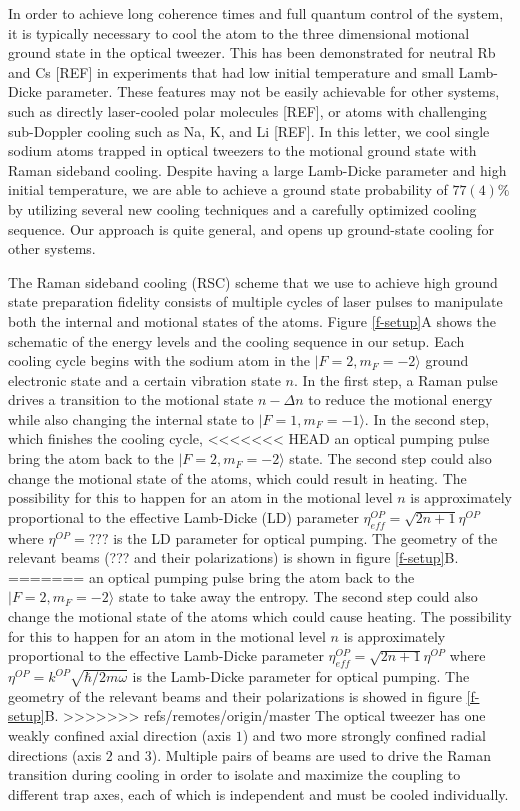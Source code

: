 \documentclass[aps,prl,twocolumn,groupedaddress]{revtex4-1}
\begin{document}
In order to achieve long coherence times and full quantum control of the system,
it is typically necessary to cool the atom to the
three dimensional motional ground state in the optical tweezer.
This has been demonstrated for neutral Rb and Cs [REF] in experiments that had low initial temperature and small Lamb-Dicke parameter.  
These features
may not be easily achievable for other systems, such as directly laser-cooled polar molecules [REF],
or atoms with challenging sub-Doppler cooling such as Na, K, and Li [REF].
In this letter, we cool single sodium atoms
trapped in optical tweezers to the motional ground state with Raman sideband cooling.
Despite having a large Lamb-Dicke parameter and high initial temperature, we are able to achieve a ground state probability of $77(4)\%$
by utilizing several new cooling techniques and a carefully optimized cooling sequence.  Our approach is quite general, and opens up ground-state cooling for other systems.

The Raman sideband cooling (RSC) scheme that we use to achieve high ground state preparation fidelity
consists of multiple cycles of laser pulses to manipulate both the internal and
motional states of the atoms.
Figure \ref{f-setup}A shows the schematic of the energy levels and the cooling sequence
in our setup.
Each cooling cycle begins with the sodium atom in the $|F=2, m_F=-2\rangle$
ground electronic state and a certain vibration state $n$.
In the first step, a Raman pulse drives a transition to the motional state $n-\Delta n$
to reduce the motional energy while also changing the internal state to $|F=1, m_F=-1\rangle$.
In the second step, which finishes the cooling cycle,
<<<<<<< HEAD
an optical pumping pulse bring the atom back to the $|F=2, m_F=-2\rangle$ state.
The second step could also change the motional state of the atoms, which
could result in heating. The possibility for this to happen for an atom in the motional level $n$
is approximately proportional to the effective Lamb-Dicke (LD) parameter
$\eta^{OP}_{ef\! f}=\sqrt{2n+1}\eta^{OP}$ where $\eta^{OP}=???$ is the LD parameter for
optical pumping.
The geometry of the relevant beams (??? and their polarizations) is shown in figure \ref{f-setup}B.
=======
an optical pumping pulse bring the atom back to the $|F=2, m_F=-2\rangle$ state to take away
the entropy. The second step could also change the motional state of the atoms which
could cause heating. The possibility for this to happen for an atom in the motional level $n$
is approximately proportional to the effective Lamb-Dicke parameter
$\eta^{OP}_{eff}=\sqrt{2n+1}\eta^{OP}$ where $\eta^{OP}=k^{OP}\sqrt{\hbar/2m\omega}$ is the Lamb-Dicke parameter for
optical pumping.
The geometry of the relevant beams and their polarizations is showed in figure \ref{f-setup}B.
>>>>>>> refs/remotes/origin/master
The optical tweezer has one weakly confined axial direction (axis $1$) and
two more strongly confined radial directions (axis $2$ and $3$).
Multiple pairs of beams are used to drive the Raman transition during cooling in order to
isolate and maximize the coupling to different trap axes, each of which is independent and must be cooled individually.
\end{document}
